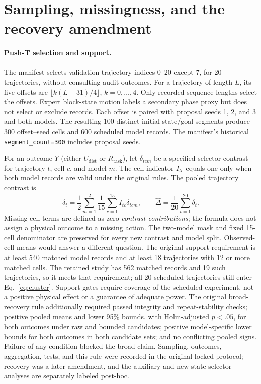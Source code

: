 \documentclass{article}
\begin{document}
\section{Sampling, missingness, and the recovery amendment}
\label{app:protocol}

\paragraph{Push-T selection and support.}
The manifest selects validation trajectory indices 0--20 except 7, for 20
trajectories, without consulting audit outcomes. For a trajectory of length
$L$, its five offsets are $\lfloor k(L-31)/4\rfloor$, $k=0,\ldots,4$.
Only recorded sequence lengths select the offsets. Expert block-state motion
labels a secondary phase proxy but does not select or exclude records.
Each offset is paired with proposal seeds 1, 2, and 3 and both models.
The resulting 100 distinct initial-state/goal segments produce 300 offset--seed
cells and 600 scheduled model records. The manifest's historical
\texttt{segment\_count=300} includes proposal seeds.

For an outcome $Y$ (either $U_{\mathrm{dist}}$ or $R_{\mathrm{task}}$), let
$\delta_{tcm}$ be a specified selector contrast for trajectory $t$, cell $c$,
and model $m$. The cell indicator $I_{tc}$ equals one only when both model
records are valid under the original rules. The pooled trajectory contrast is
\begin{equation}
 \bar\delta_t=\frac{1}{2}\sum_{m=1}^{2}
          \frac{1}{15}\sum_{c=1}^{15} I_{tc}\delta_{tcm},
 \qquad \widehat\Delta=\frac{1}{20}\sum_{t=1}^{20}\bar\delta_t.
 \label{eq:cluster}
\end{equation}
Missing-cell terms are defined as zero \emph{contrast contributions}; the
formula does not assign a physical outcome to a missing action. The two-model
mask and fixed 15-cell denominator are preserved for every new contrast and
model split. Observed-cell means would answer a different question.
The original support requirement is at least 540 matched model records and
at least 18 trajectories with 12 or more matched cells. The retained study
has 562 matched records and 19 such trajectories, so it meets that requirement;
all 20 scheduled trajectories still enter Eq.~\ref{eq:cluster}.
Support gates require coverage of the scheduled experiment, not a positive
physical effect or a guarantee of adequate power. The original broad-recovery
rule additionally required passed integrity and repeat-stability checks;
positive pooled means and lower 95\% bounds, with Holm-adjusted $p<.05$, for
both outcomes under raw and bounded candidates; positive model-specific lower
bounds for both outcomes in both candidate sets; and no conflicting pooled
signs. Failure of any condition blocked the broad claim. Sampling, outcomes,
aggregation, tests, and this rule were recorded in the original locked protocol;
recovery was a later amendment, and the auxiliary and new state-selector
analyses are separately labeled post-hoc.
\end{document}
